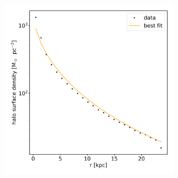 \begin{figure}
\begin{subfigure}[b]{0.3\textwidth}
    	\label{fig:spher_surfdens_fit}
    \end{subfigure}
    ~ %
    \begin{subfigure}[b]{0.3\textwidth}
    \centering
    	\includegraphics[width=\textwidth]{plots/Auriga/surface_dens_halo_fit_data.png}
    	\label{fig:halo_surfdens_fit}
    \end{subfigure}
    

\end{figure}
